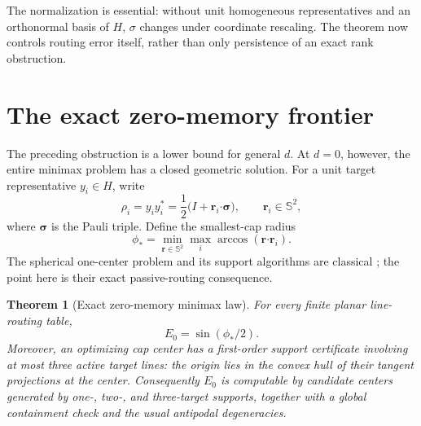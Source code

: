 \documentclass[11pt]{article}
\newtheorem{theorem}{Theorem}[section]
\theoremstyle{definition}\newtheorem{definition}[theorem]{Definition}\newtheorem{example}[theorem]{Example}
\theoremstyle{remark}\newtheorem{remark}[theorem]{Remark}\newtheorem{limitation}[theorem]{Limitation}
\begin{document}
The normalization is essential: without unit homogeneous representatives and
an orthonormal basis of $H$, $\sigma$ changes under coordinate rescaling.  The
theorem now controls routing error itself, rather than only persistence of an
exact rank obstruction.

\section{The exact zero-memory frontier}

The preceding obstruction is a lower bound for general $d$.  At $d=0$, however,
the entire minimax problem has a closed geometric solution.  For a unit target
representative $y_i\in H$, write
\[
 \rho_i=y_i y_i^*=\frac12\bigl(I+\mathbf r_i\boldsymbol\cdot\boldsymbol\sigma\bigr),
 \qquad \mathbf r_i\in\mathbb S^2,
\]
where $\boldsymbol\sigma$ is the Pauli triple.  Define the smallest-cap radius
\begin{equation}\label{eq:cap-radius}
 \phi_*=\min_{\mathbf r\in\mathbb S^2}\max_i
              \arccos(\mathbf r\boldsymbol\cdot\mathbf r_i).
\end{equation}
The spherical one-center problem and its support algorithms are classical
\cite{Flemming2024}; the point here is their exact passive-routing consequence.

\begin{theorem}[Exact zero-memory minimax law]\label{thm:zero-memory}
For every finite planar line-routing table,
\begin{equation}\label{eq:zero-memory}
                         \boxed{E_0=\sin(\phi_*/2)}.
\end{equation}
Moreover, an optimizing cap center has a first-order support certificate
involving at most three active target lines: the origin lies in the convex hull
of their tangent projections at the center.  Consequently $E_0$ is computable
by candidate centers generated by one-, two-, and three-target supports,
together with a global containment check and the usual antipodal degeneracies.
\end{theorem}
\end{document}
